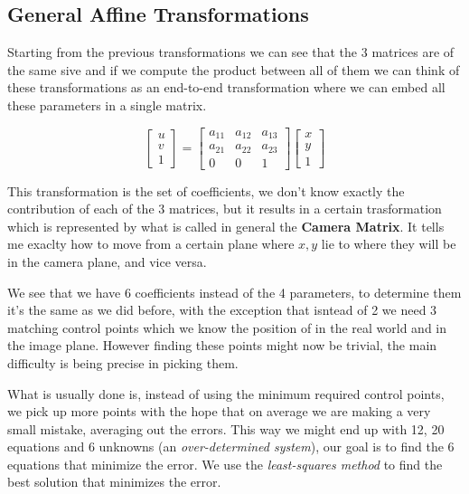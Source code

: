 \subsection{General Affine Transformations}

Starting from the previous transformations we can see that the 3 matrices are of the same sive and if we compute the product between all of them we can think of these transformations as an end-to-end transformation where we can embed all these parameters in a single matrix.

\[
    \begin{bmatrix}
    u \\
    v \\
    1
    \end{bmatrix}
    =
    \begin{bmatrix}
    a_{11} & a_{12} & a_{13} \\
    a_{21} & a_{22} & a_{23} \\
    0 & 0 & 1
    \end{bmatrix}
    \begin{bmatrix}
        x \\
        y \\
        1
    \end{bmatrix}
\]

This transformation is the set of coefficients, we don't know exactly the contribution of each of the 3 matrices, but it results in a certain trasformation which is represented by what is called in general the \textbf{Camera Matrix}. It tells me exaclty how to move from a certain plane where \(x, y\) lie to where they will be in the camera plane, and vice versa.

We see that we have 6 coefficients instead of the 4 parameters, to determine them it's the same as we did before, with the exception that isntead of 2 we need 3 matching control points which we know the position of in the real world and in the image plane. However finding these points might now be trivial,
the main difficulty is being precise in picking them.

What is usually done is, instead of using the minimum required control points, we pick up more points with the hope that on average we are making a very small mistake, averaging out the errors. This way we might end up with 12, 20 equations and 6 unknowns (an \textit{over-determined system}), our goal is to find the 6 equations that minimize the error. We use the \textit{least-squares method} to find the best solution that minimizes the error.



